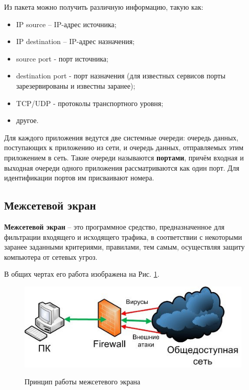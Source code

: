 \newpage

Из пакета можно получить различную информацию, такую как:
\begin{itemize}
	\item IP source – IP-адрес источника;
	
	\item IP destination – IP-адрес назначения;
	
	\item source port - порт источника;
	
	\item destination port - порт назначения (для известных сервисов порты зарезервированы и известны заранее);
	
	\item TCP/UDP - протоколы транспортного уровня;
	
	\item другое. \\
\end{itemize}

Для каждого приложения ведутся две системные очереди: очередь данных, поступающих к приложению из сети, и очередь данных, отправляемых этим приложением в сеть. Такие очереди называются \textbf{портами}, причём входная и выходная очереди одного приложения рассматриваются как один порт. Для идентификации портов им присваивают номера. \newline

\subsection{Межсетевой экран}
\textbf{Межсетевой экран} -- это программное средство, предназначенное для фильтрации входящего и исходящего трафика, в соответствии с некоторыми заранее заданными критериями, правилами, тем самым, осуществляя защиту компьютера от сетевых угроз. 

В общих чертах его работа изображена на Рис. \ref{fig1:image}.

\begin{figure}[ph!]
	\centering
	\begin{center}
		{\includegraphics[scale=0.5]{img/firewall.jpg}}
		\caption{Принцип работы межсетевого экрана}
		\label{fig1:image}
	\end{center}
\end{figure}

